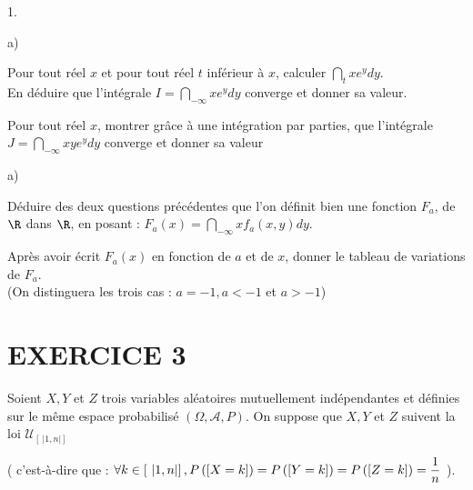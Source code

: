 \documentclass[11pt]{article}%
\begin{document}
\begin{noliste}{1.}
 \setlength{\itemsep}{4mm}
\item 
\begin{noliste}{a)}
 \setlength{\itemsep}{2mm}
\item Pour tout réel $x$ et pour tout réel $t$ inférieur à $x $,
calculer $\dint \nolimits_{t}{x}e^{y}dy.$\\
En déduire que l'intégrale $I = \dint \nolimits_{-\infty }{x}e^{y}dy$
converge et donner sa valeur.

\item Pour tout réel $x$, montrer gr\^{a}ce à une intégration
par parties, que l'intégrale $J = \dint \nolimits_{-\infty
}{x}ye^{y}dy$
converge et donner sa valeur
\end{noliste}

\item 
\begin{noliste}{a)}
 \setlength{\itemsep}{2mm}
\item Déduire des deux questions précédentes que l'on définit bien une
fonction $F_{a}$, de $\R$ dans $\R$, en
posant : $F_{a}\left( x\right) = \dint \nolimits_{-\infty
}{x}f_{a}\left(
x,y\right) dy.$

\item Après avoir écrit $F_{a}\left( x\right) $ en fonction de $a$
et de $x$, donner le tableau de variations de $F_{a}.$\\
(On distinguera les trois cas : $a = -1,a<-1$ et $a>-1$)
\end{noliste}
\end{noliste}

\section*{EXERCICE 3}

Soient $X,Y$ et $Z$ trois variables aléatoires mutuellement
indépendantes et définies sur le même espace probabilisé $\left(
\Omega,\mathcal{A},P\right).$ On suppose que $X,Y$ et $Z$ suivent la
loi $\mathcal{U}_{\left[ \ \left| 1,n\right| \right] }$ 

( c'est-à-dire que : $\forall k\in \left[ \ \left| 1,n\right|
\right],P\left(\Ev{ X = k}\right) = P\left(\Ev{ Y = k}\right) =
P\left(\Ev{ Z = k}\right) = \dfrac{1}{n}$
).
\end{document}

